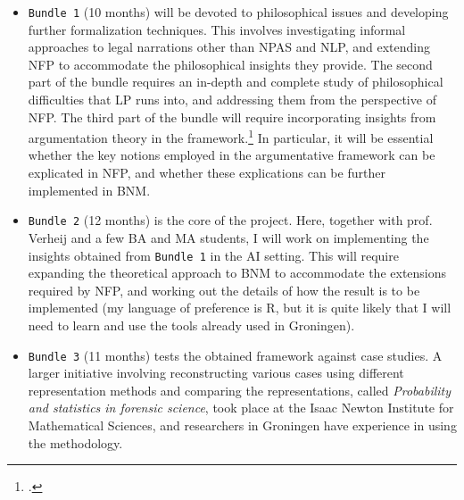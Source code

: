 \documentclass[11pt, a4paper]{article}
\begin{document}
\begin{itemize}\setlength\itemsep{-1.5mm}

\vspace{-2mm}

\item \verb|Bundle 1| (10 months) will be devoted to philosophical issues and developing further formalization techniques. %
This involves investigating informal approaches to legal narrations other than NPAS and NLP, and extending NFP to accommodate the philosophical insights they provide. The second part  of the bundle requires an in-depth and complete study of philosophical difficulties that LP runs into, and  addressing them from the perspective of NFP.  The third part of the bundle will require incorporating insights from argumentation theory in the framework.\footcite{FransvanEemeren2014,PietroBaroni2018} %
In particular, it will be essential whether the key notions employed in the argumentative framework can be explicated in NFP, and whether these explications can be further implemented in BNM.   


\item \verb|Bundle 2| (12 months) is the core of the project. Here, together with prof. Verheij and a few BA and MA students,  I will work on implementing the insights obtained from \verb|Bundle 1| in the AI setting. This will require expanding the theoretical approach to BNM to accommodate the extensions required by NFP, and working out the details of how the result is to be implemented (my language of preference is \textsf{R}, but it is quite likely that I will need to learn and use the tools already used in Groningen).


\item \verb|Bundle 3| (11 months) tests the obtained framework against case studies. A larger initiative involving reconstructing various cases using different representation methods and comparing the representations, called \emph{Probability and statistics in forensic science}, took place at the Isaac Newton Institute for Mathematical Sciences, and  researchers in Groningen have experience in using the methodology.   
\end{itemize}
\vspace{-2mm}
\end{document}

